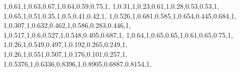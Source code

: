 \documentclass[
]{book}
\newenvironment{Shaded}{\begin{snugshade}}{\end{snugshade}}
\newcommand{\DecValTok}[1]{\textcolor[rgb]{0.00,0.00,0.81}{#1}}
\newcommand{\FloatTok}[1]{\textcolor[rgb]{0.00,0.00,0.81}{#1}}
\newcommand{\NormalTok}[1]{#1}
\begin{document}
\begin{Shaded}
\begin{Highlighting}[]
        \DecValTok{1}\NormalTok{,}\FloatTok{0.61}\NormalTok{,}\DecValTok{1}\NormalTok{,}\FloatTok{0.63}\NormalTok{,}\FloatTok{0.67}\NormalTok{,}\DecValTok{1}\NormalTok{,}\FloatTok{0.64}\NormalTok{,}\FloatTok{0.59}\NormalTok{,}\FloatTok{0.75}\NormalTok{,}\DecValTok{1}\NormalTok{,}
        \DecValTok{1}\NormalTok{,}\FloatTok{0.31}\NormalTok{,}\DecValTok{1}\NormalTok{,}\FloatTok{0.23}\NormalTok{,}\FloatTok{0.61}\NormalTok{,}\DecValTok{1}\NormalTok{,}\FloatTok{0.28}\NormalTok{,}\FloatTok{0.53}\NormalTok{,}\FloatTok{0.53}\NormalTok{,}\DecValTok{1}\NormalTok{,}
        \DecValTok{1}\NormalTok{,}\FloatTok{0.65}\NormalTok{,}\DecValTok{1}\NormalTok{,}\FloatTok{0.51}\NormalTok{,}\FloatTok{0.35}\NormalTok{,}\DecValTok{1}\NormalTok{,}\FloatTok{0.5}\NormalTok{,}\FloatTok{0.41}\NormalTok{,}\FloatTok{0.42}\NormalTok{,}\DecValTok{1}\NormalTok{,}
        \DecValTok{1}\NormalTok{,}\FloatTok{0.526}\NormalTok{,}\DecValTok{1}\NormalTok{,}\FloatTok{0.681}\NormalTok{,}\FloatTok{0.585}\NormalTok{,}\DecValTok{1}\NormalTok{,}\FloatTok{0.654}\NormalTok{,}\FloatTok{0.445}\NormalTok{,}\FloatTok{0.684}\NormalTok{,}\DecValTok{1}\NormalTok{,}
        \DecValTok{1}\NormalTok{,}\FloatTok{0.307}\NormalTok{,}\DecValTok{1}\NormalTok{,}\FloatTok{0.632}\NormalTok{,}\FloatTok{0.462}\NormalTok{,}\DecValTok{1}\NormalTok{,}\FloatTok{0.586}\NormalTok{,}\FloatTok{0.283}\NormalTok{,}\FloatTok{0.446}\NormalTok{,}\DecValTok{1}\NormalTok{,}
        \DecValTok{1}\NormalTok{,}\FloatTok{0.517}\NormalTok{,}\DecValTok{1}\NormalTok{,}\FloatTok{0.6}\NormalTok{,}\FloatTok{0.527}\NormalTok{,}\DecValTok{1}\NormalTok{,}\FloatTok{0.548}\NormalTok{,}\FloatTok{0.405}\NormalTok{,}\FloatTok{0.687}\NormalTok{,}\DecValTok{1}\NormalTok{,}
        \DecValTok{1}\NormalTok{,}\FloatTok{0.64}\NormalTok{,}\DecValTok{1}\NormalTok{,}\FloatTok{0.65}\NormalTok{,}\FloatTok{0.65}\NormalTok{,}\DecValTok{1}\NormalTok{,}\FloatTok{0.61}\NormalTok{,}\FloatTok{0.65}\NormalTok{,}\FloatTok{0.75}\NormalTok{,}\DecValTok{1}\NormalTok{,}
        \DecValTok{1}\NormalTok{,}\FloatTok{0.26}\NormalTok{,}\DecValTok{1}\NormalTok{,}\FloatTok{0.549}\NormalTok{,}\FloatTok{0.497}\NormalTok{,}\DecValTok{1}\NormalTok{,}\FloatTok{0.192}\NormalTok{,}\FloatTok{0.265}\NormalTok{,}\FloatTok{0.249}\NormalTok{,}\DecValTok{1}\NormalTok{,}
        \DecValTok{1}\NormalTok{,}\FloatTok{0.26}\NormalTok{,}\DecValTok{1}\NormalTok{,}\FloatTok{0.551}\NormalTok{,}\FloatTok{0.507}\NormalTok{,}\DecValTok{1}\NormalTok{,}\FloatTok{0.176}\NormalTok{,}\FloatTok{0.101}\NormalTok{,}\FloatTok{0.257}\NormalTok{,}\DecValTok{1}\NormalTok{,}
        \DecValTok{1}\NormalTok{,}\FloatTok{0.5376}\NormalTok{,}\DecValTok{1}\NormalTok{,}\FloatTok{0.6336}\NormalTok{,}\FloatTok{0.8396}\NormalTok{,}\DecValTok{1}\NormalTok{,}\FloatTok{0.8905}\NormalTok{,}\FloatTok{0.6887}\NormalTok{,}\FloatTok{0.8154}\NormalTok{,}\DecValTok{1}\NormalTok{,}

\end{Highlighting}
\end{Shaded}
\end{document}

